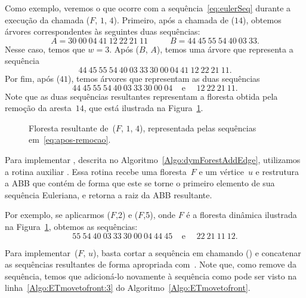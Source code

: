 Como exemplo, veremos o que ocorre com a sequência~\eqref{eq:eulerSeq} durante a execução da chamada \dymForestDelEdge($F$, $1$, $4$).
Primeiro, após a chamada de \treapSplit($14$), obtemos árvores correspondentes às seguintes duas sequências:
\begin{equation}
A = 30~00~04~41~12~22~21~11~~~~~~~~~~~~B = 44~45~55~54~40~03~33.\nonumber
\end{equation}
Nesse caso, temos que $w=3$. Após \treapJoin($B$, $A$), temos uma árvore que representa a sequência
\begin{equation}
 44~45~55~54~40~03~33~30~00~04~41~12~22~21~11.\nonumber
\end{equation}
Por fim, após \treapSplit($41$), temos árvores que representam as duas sequências
\begin{equation}
 44~45~55~54~40~03~33~30~00~04~~~~~\text{e}~~~~~~12~22~21~11.\label{eq:apos-remocao}
\end{equation}
Note que as duas sequências resultantes representam a floresta obtida pela remoção da aresta~$14$, que está ilustrada na Figura~\ref{fig:algorit-del-pos}.

\begin{figure}[htb]
\centering

\caption{Floresta resultante de~\dymForestDelEdge($F$, $1$, $4$), representada pelas sequências em~\eqref{eq:apos-remocao}.}
\label{fig:algorit-del-pos}
\end{figure}

Para implementar \dymForestAddEdge{}, descrita no Algoritmo~\ref{Algo:dymForestAddEdge}, utilizamos a rotina auxiliar \ETmovetofront{}.
Essa rotina recebe uma floresta~$F$ e um vértice~$u$ e restrutura a ABB que contém  de forma que este se torne o primeiro elemento de sua sequência Euleriana, e retorna a raiz da ABB resultante. 

Por exemplo, se aplicarmos \ETmovetofront($F$,2) e \ETmovetofront($F$,5), onde $F$ é a floresta dinâmica ilustrada na Figura~\ref{fig:algorit-del-pos}, obtemos as sequências:
\begin{equation}
55~54~40~03~33~30~00~04~44~45~~~~~\text{e}~~~~~~22~21~11~12.\label{eq:apos-moveToFront}
\end{equation}

Para implementar~\ETmovetofront($F$, $u$), basta cortar a sequência em  chamando \treapSplit() e concatenar as sequências resultantes de forma apropriada com~\treapJoin{}.
Note que, como \treapSplit{} remove  da sequência, temos que adicioná-lo novamente à sequência como pode ser visto na linha~\ref{Algo:ETmovetofront:3} do Algoritmo~\ref{Algo:ETmovetofront}.

